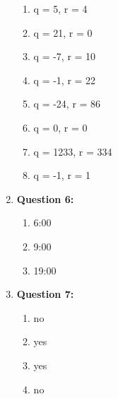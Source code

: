 \documentclass[11pt]{article}
\begin{document}
\begin{enumerate}
\begin{enumerate}[label=(\alph*)]
\item q = 5, r = 4
\item q = 21, r = 0
\item q = -7, r = 10
\item q = -1, r = 22
\item q = -24, r = 86
\item q = 0, r = 0
\item q = 1233, r = 334
\item q = -1, r = 1
\end{enumerate}

\item
\textbf{Question 6:}

\begin{enumerate}[label=(\alph*)]
\item 6:00
\item 9:00
\item 19:00
\end{enumerate}

\item
\textbf{Question 7:}

\begin{enumerate}[label=(\alph*)]
\item no
\item yes
\item yes
\item no
\end{enumerate}

\end{enumerate}
\end{document}
